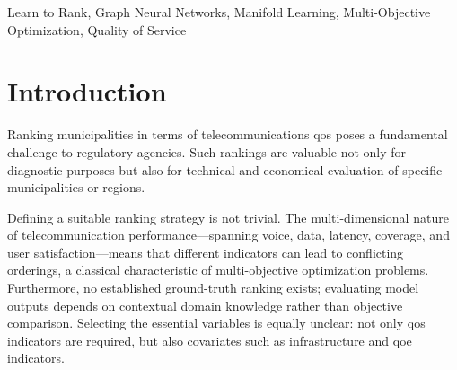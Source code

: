 \documentclass[english]{sbrt}
\begin{document}
\begin{abstract}
Assessing the quality of telecommunications services across municipalities with heterogeneous structural, geographic, and socioeconomic conditions requires methodologies that go beyond simple weighted averages. This paper introduces Manifold Ranker, a \gls{gnn}-based self-supervised ranking framework that learns the geometry of municipality-level telecom quality indicators on a $k$-nearest-neighbor graph and produces a unified ranking score. The proposed architecture employs Residual Graph Convolutional layers and is trained with a multi-objective loss function that simultaneously enforces pairwise ranking consistency, input reconstruction fidelity, geometric smoothness on the learned manifold, and directional alignment with a Pareto-inspired proxy. We validate the approach on a longitudinal dataset covering Brazilian municipalities over multiple monthly periods, totaling over 82{,}000 municipality--period observations. Results show that the proposed model produces scores with a substantially wider effective range (standard deviation of 0.098) compared to the legacy \gls{iqs} (0.054) and revised \gls{iqs} (0.058) baselines, improving rank discrimination. Distribution and geographic visualizations confirm that the framework yields well-distributed and distinguishable municipality rankings, overcoming the saturation that affects current regulatory composites.
\end{abstract}

\begin{keywords}
Learn to Rank, Graph Neural Networks, Manifold Learning, Multi-Objective Optimization, Quality of Service
\end{keywords}


\section{Introduction}

Ranking municipalities in terms of telecommunications \gls{qos} poses a fundamental challenge to regulatory agencies. Such rankings are valuable not only for diagnostic purposes but also for technical and economical evaluation of specific municipalities or regions.

Defining a suitable ranking strategy is not trivial. The multi-dimensional nature of telecommunication performance---spanning voice, data, latency, coverage, and user satisfaction---means that different indicators can lead to conflicting orderings, a classical characteristic of multi-objective optimization problems. Furthermore, no established ground-truth ranking exists; evaluating model outputs depends on contextual domain knowledge rather than objective comparison. Selecting the essential variables is equally unclear: not only \gls{qos} indicators are required, but also covariates such as infrastructure and \gls{qoe} indicators.
\end{document}
